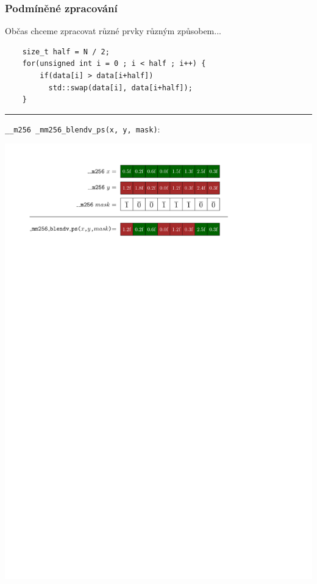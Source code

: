 \documentclass[usenames,dvipsnames,9pt]{beamer}
\begin{document}
\begin{frame}[fragile]
  \frametitle{Podmíněné zpracování}

  Občas chceme zpracovat různé prvky různým způsobem...
  \begin{verbatim}
    size_t half = N / 2;
    for(unsigned int i = 0 ; i < half ; i++) {
        if(data[i] > data[i+half])
          std::swap(data[i], data[i+half]);
    }
  \end{verbatim}

  \pause
  \vspace{1em}\hrule\vspace{1em}
  \texttt{__m256 _mm256_blendv_ps(x, y, mask)}:
  \begin{center}
    \includegraphics[width=0.95\linewidth]{07/figs/blendv.pdf}
  \end{center}
\end{frame}
\end{document}
